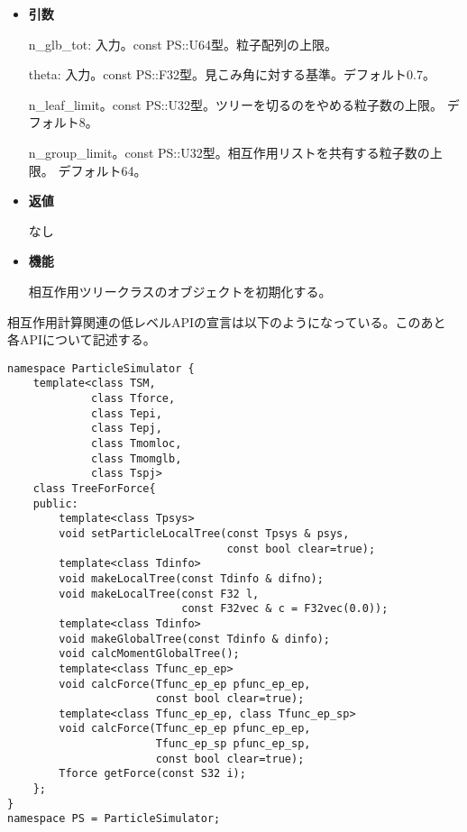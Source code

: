 \begin{itemize}

\item {\bf 引数}

n\_glb\_tot: 入力。const PS::U64型。粒子配列の上限。

theta: 入力。const PS::F32型。見こみ角に対する基準。デフォルト0.7。

n\_leaf\_limit。const PS::U32型。ツリーを切るのをやめる粒子数の上限。
デフォルト8。

n\_group\_limit。const PS::U32型。相互作用リストを共有する粒子数の上限。
デフォルト64。

\item {\bf 返値}

なし

\item {\bf 機能}

相互作用ツリークラスのオブジェクトを初期化する。

\end{itemize}


相互作用計算関連の低レベルAPIの宣言は以下のようになっている。このあと
各APIについて記述する。
\begin{lstlisting}[caption=TreeForForce1]
namespace ParticleSimulator {
    template<class TSM,
             class Tforce,
             class Tepi,
             class Tepj,
             class Tmomloc,
             class Tmomglb,
             class Tspj>
    class TreeForForce{
    public:
        template<class Tpsys>
        void setParticleLocalTree(const Tpsys & psys,
                                  const bool clear=true);
        template<class Tdinfo>
        void makeLocalTree(const Tdinfo & difno);
        void makeLocalTree(const F32 l,
                           const F32vec & c = F32vec(0.0));
        template<class Tdinfo>
        void makeGlobalTree(const Tdinfo & dinfo);        
        void calcMomentGlobalTree();
        template<class Tfunc_ep_ep>
        void calcForce(Tfunc_ep_ep pfunc_ep_ep,
                       const bool clear=true);
        template<class Tfunc_ep_ep, class Tfunc_ep_sp>
        void calcForce(Tfunc_ep_ep pfunc_ep_ep,
                       Tfunc_ep_sp pfunc_ep_sp,
                       const bool clear=true);
        Tforce getForce(const S32 i);
    };
}
namespace PS = ParticleSimulator;
\end{lstlisting}


